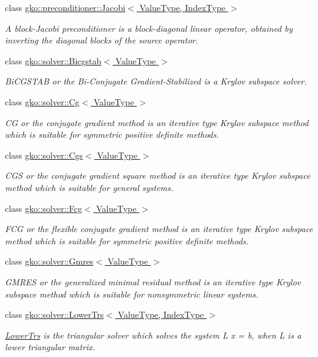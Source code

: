 \begin{DoxyCompactItemize}
class \hyperlink{classgko_1_1preconditioner_1_1Jacobi}{gko\+::preconditioner\+::\+Jacobi$<$ Value\+Type, Index\+Type $>$}
\begin{DoxyCompactList}\small\item\em A block-\/\+Jacobi preconditioner is a block-\/diagonal linear operator, obtained by inverting the diagonal blocks of the source operator. \end{DoxyCompactList}\item 
class \hyperlink{classgko_1_1solver_1_1Bicgstab}{gko\+::solver\+::\+Bicgstab$<$ Value\+Type $>$}
\begin{DoxyCompactList}\small\item\em Bi\+C\+G\+S\+T\+AB or the Bi-\/\+Conjugate Gradient-\/\+Stabilized is a Krylov subspace solver. \end{DoxyCompactList}\item 
class \hyperlink{classgko_1_1solver_1_1Cg}{gko\+::solver\+::\+Cg$<$ Value\+Type $>$}
\begin{DoxyCompactList}\small\item\em CG or the conjugate gradient method is an iterative type Krylov subspace method which is suitable for symmetric positive definite methods. \end{DoxyCompactList}\item 
class \hyperlink{classgko_1_1solver_1_1Cgs}{gko\+::solver\+::\+Cgs$<$ Value\+Type $>$}
\begin{DoxyCompactList}\small\item\em C\+GS or the conjugate gradient square method is an iterative type Krylov subspace method which is suitable for general systems. \end{DoxyCompactList}\item 
class \hyperlink{classgko_1_1solver_1_1Fcg}{gko\+::solver\+::\+Fcg$<$ Value\+Type $>$}
\begin{DoxyCompactList}\small\item\em F\+CG or the flexible conjugate gradient method is an iterative type Krylov subspace method which is suitable for symmetric positive definite methods. \end{DoxyCompactList}\item 
class \hyperlink{classgko_1_1solver_1_1Gmres}{gko\+::solver\+::\+Gmres$<$ Value\+Type $>$}
\begin{DoxyCompactList}\small\item\em G\+M\+R\+ES or the generalized minimal residual method is an iterative type Krylov subspace method which is suitable for nonsymmetric linear systems. \end{DoxyCompactList}\item 
class \hyperlink{classgko_1_1solver_1_1LowerTrs}{gko\+::solver\+::\+Lower\+Trs$<$ Value\+Type, Index\+Type $>$}
\begin{DoxyCompactList}\small\item\em \hyperlink{classgko_1_1solver_1_1LowerTrs}{Lower\+Trs} is the triangular solver which solves the system L x = b, when L is a lower triangular matrix. \end{DoxyCompactList}\end{DoxyCompactItemize}
